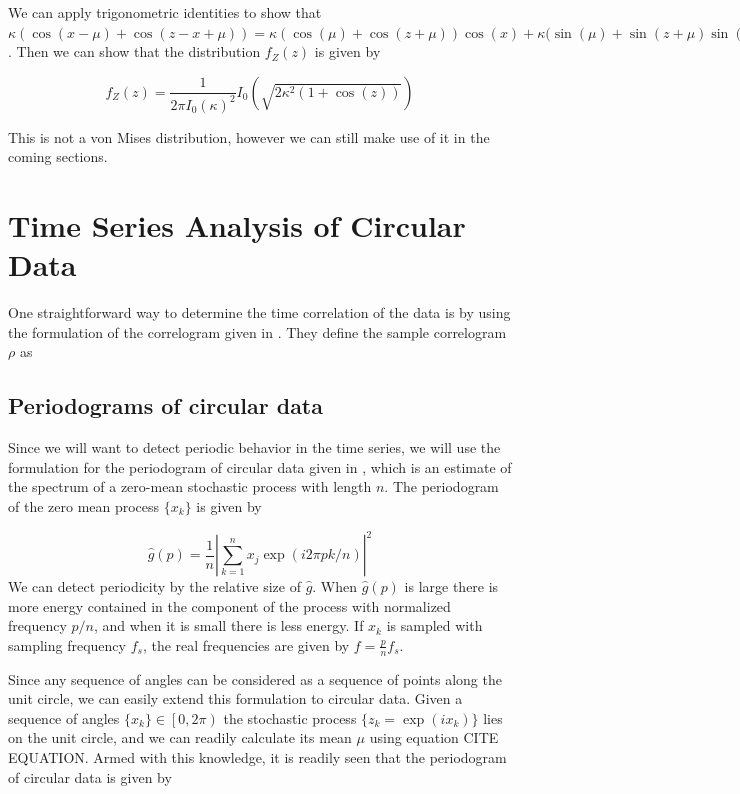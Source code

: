 \documentclass[11pt]{article}
\numberwithin{equation}{section}
\numberwithin{figure}{section}
\begin{document}
We can apply trigonometric identities to show that $\kappa (\cos( x-\mu )+\cos( z-x+\mu )) = \kappa (\cos(\mu)+\cos(z+\mu))\cos( x ) +\kappa(\sin(\mu)+\sin( z+\mu )\sin(x)$. Then we can show that the distribution $f_Z(z)$ is given by 

\begin{equation}\label{eq:sumdist}
f_Z(z) = \frac{1}{2\pi I_0(\kappa)^2}I_0\left ( \sqrt{ 2\kappa^2(1+\cos(z)) } \right)
\end{equation}

This is not a von Mises distribution, however we can still make use of it in the coming sections.

\section{Time Series Analysis of Circular Data}

One straightforward way to determine the time correlation of the data is by using the formulation of the correlogram given in \cite{fisher}. They define the sample correlogram $\rho$ as

\subsection{Periodograms of circular data}

Since we will want to detect periodic behavior in the time series, we will use the formulation for the periodogram of circular data given in \cite{Craig}, which is an estimate of the spectrum of a zero-mean stochastic process with length $n$. The periodogram of the zero mean process $\{x_k\}$ is given by 

\begin{equation}\label{eq:pgram}
\hat{g}(p) = \frac{1}{n}\left |{ \sum_{k=1}^n x_j \exp(i 2 \pi p k/n ) }\right | ^2
\end{equation}
 We can detect periodicity by the relative size of $\hat{g}$. When $\hat{g}(p)$ is large there is more energy contained in the component of the process with normalized frequency $p/n$, and when it is small there is less energy. If ${x_k}$ is sampled with sampling frequency $f_s$, the real frequencies are given by $f = \frac{p}{n}f_s$. 

Since any sequence of angles can be considered as a sequence of points along the unit circle, we can easily extend this formulation to circular data. Given a sequence of angles $\{x_k\} \in \left [0,2\pi \right)$ the stochastic process $\{z_k = \exp(i x_k)\}$ lies on the unit circle, and we can readily calculate its mean $\mu$ using equation CITE EQUATION. Armed with this knowledge, it is readily seen that the periodogram of circular data is given by 
\end{document}
